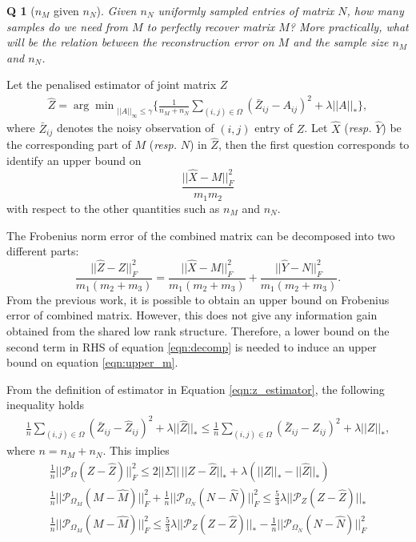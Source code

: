 \documentclass{article} %
\newtheorem{question}{Q}
\newcommand\mc{\mathcal} %
\begin{document}
\begin{question}[$n_M$ given $n_N$]
Given $n_N$ uniformly sampled entries of matrix $N$, how many samples do we need from $M$ to perfectly recover matrix $M$? More practically, what will be the relation between the reconstruction error on $M$ and the sample size $n_M$ and $n_N$.
\end{question}
Let the penalised estimator of joint matrix $Z$
\begin{align}
\label{eqn:z_estimator}
\hat{Z} = {\arg\min}_{||{A}||_\infty \leq \gamma} \bigg\{\frac{1}{n_M + n_N} \sum_{(i,j) \in \Omega}(\bar{Z}_{ij} - {A}_{ij})^2 + \lambda ||{A}||_* \bigg\},
\end{align}
where $\bar{Z}_{ij}$ denotes the noisy observation of $(i,j)$ entry of $Z$. Let $\hat{X}$ (\textit{resp.} $\hat{Y}$) be the corresponding part of $M$ (\textit{resp.} $N$) in $\hat{Z}$, then the first question corresponds to identify an upper bound on
\begin{equation}
\label{eqn:upper_m}
\frac{||\hat{X} - M||_F^2}{m_1m_2}
\end{equation}
with respect to the other quantities such as $n_M$ and $n_N$.

The Frobenius norm error of the combined matrix can be decomposed into two different parts:
\begin{equation}
\label{eqn:decomp}
\frac{||\hat{Z} - Z||_F^2}{m_1(m_2+m_3)} = \frac{||\hat{X} - M||_F^2}{m_1(m_2+m_3)} + \frac{||\hat{Y} - N||_F^2}{m_1(m_2+m_3)}.
\end{equation}
From the previous work, it is possible to obtain an upper bound on Frobenius error of combined matrix. However, this does not give any information gain obtained from the shared low rank structure. Therefore, a lower bound on the second term in RHS of equation \ref{eqn:decomp} is needed to induce an upper bound on equation \ref{eqn:upper_m}.

From the definition of estimator in Equation \ref{eqn:z_estimator}, the following inequality holds
\begin{align}
\frac{1}{n} \sum_{(i,j) \in \Omega}(\bar{Z}_{ij} - \hat{Z}_{ij})^2 + \lambda ||\hat{Z}||_* 
\leq \frac{1}{n} \sum_{(i,j) \in \Omega}(\bar{Z}_{ij} - {Z}_{ij})^2 + \lambda ||{Z}||_*,
\end{align}
where $n = n_M + n_N$. This implies
\begin{align}
\frac{1}{n}||\mathcal{P}_\Omega(Z - \hat{Z}) ||_F^2 \leq 2||\Sigma||\,||Z - \hat{Z}||_* + \lambda(||Z||_* - ||\hat{Z}||_*) \\
\frac{1}{n}||\mc{P}_{\Omega_M}(M-\hat{M})||_F^2 + \frac{1}{n}||\mc{P}_{\Omega_N}(N-\hat{N})||_F^2
\leq \frac{5}{3}\lambda ||\mc{P}_Z(Z-\hat{Z})||_* \\
\frac{1}{n}||\mc{P}_{\Omega_M}(M-\hat{M})||_F^2 
\leq \frac{5}{3}\lambda ||\mc{P}_Z(Z-\hat{Z})||_* - \frac{1}{n}||\mc{P}_{\Omega_N}(N-\hat{N})||_F^2
\end{align}
\end{document}
